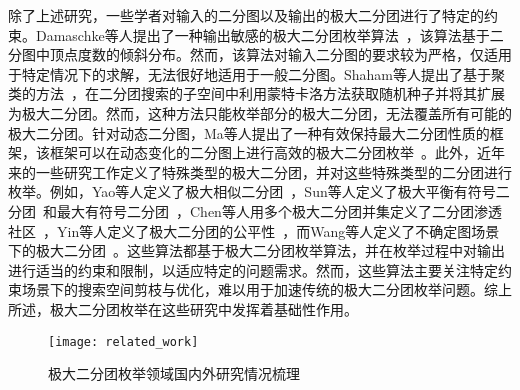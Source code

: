 除了上述研究，一些学者对输入的二分图以及输出的极大二分团进行了特定的约束。Damaschke等人提出了一种输出敏感的极大二分团枚举算法~\cite{Damaschke14}，该算法基于二分图中顶点度数的倾斜分布。然而，该算法对输入二分图的要求较为严格，仅适用于特定情况下的求解，无法很好地适用于一般二分图。Shaham等人提出了基于聚类的方法~\cite{Shaham16}，在二分团搜索的子空间中利用蒙特卡洛方法获取随机种子并将其扩展为极大二分团。然而，这种方法只能枚举部分的极大二分团，无法覆盖所有可能的极大二分团。针对动态二分图，Ma等人提出了一种有效保持最大二分团性质的框架，该框架可以在动态变化的二分图上进行高效的极大二分团枚举~\cite{Ma22}。此外，近年来的一些研究工作定义了特殊类型的极大二分团，并对这些特殊类型的二分团进行枚举。例如，Yao等人定义了极大相似二分团~\cite{SimilarMBE22}，Sun等人定义了极大平衡有符号二分团~\cite{Sun22}和最大有符号二分团~\cite{Sun23}，Chen等人用多个极大二分团并集定义了二分团渗透社区~\cite{BicliqueCommunity23}，Yin等人定义了极大二分团的公平性~\cite{FairMBE23}，而Wang等人定义了不确定图场景下的极大二分团~\cite{MBEU23}。这些算法都基于极大二分团枚举算法，并在枚举过程中对输出进行适当的约束和限制，以适应特定的问题需求。然而，这些算法主要关注特定约束场景下的搜索空间剪枝与优化，难以用于加速传统的极大二分团枚举问题。综上所述，极大二分团枚举在这些研究中发挥着基础性作用。


\begin{figure} [H]
  \centering

  \texttt{[image: related\_work]}

  \caption{极大二分团枚举领域国内外研究情况梳理}
  \label{fig:related_work}
\end{figure}

